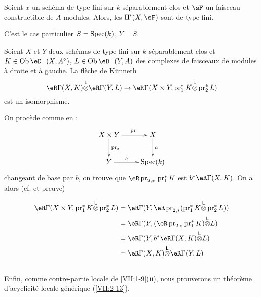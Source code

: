 \begin{corollary_}\label{VII:1-10}
Soient $x$ un schéma de type fini sur $k$ séparablement clos et $\sF$ un 
faisceau constructible de $A$-modules. Alors, les $\h^i(X,\sF)$ sont de type 
fini. 
\end{corollary_}

C'est le cas particulier $S=\operatorname{Spec}(k)$, $Y=S$. 

\begin{corollary_}\label{VII:1-11}
Soient $X$ et $Y$ deux schémas de type fini sur $k$ séparablement clos et 
$K\in \ob\eD^-(X,A^\circ)$, $L\in \ob\eD^-(Y,A)$ des complexes de faisceaux de 
modules à droite et à gauche. La flèche de K\"unneth 
\[
  \eR \Gamma(X,K) \lotimes \eR \Gamma(Y,L) \to \eR\Gamma(X\times Y,\operatorname{pr}_1^\ast K \lotimes \operatorname{pr}_2^\ast L) 
\]
est un isomorphisme. 
\end{corollary_}

On procède comme en \cite[XVII 5.4.3]{sga4}: 
\[\xymatrix{
  X\times Y \ar[r]^-{\text{pr}_1} \ar[d]^-{\text{pr}_2} 
    & X \ar[d]^-a \\
  Y \ar[r]^-b 
    & \spec(k) 
}\]
changeant de base par $b$, on trouve que 
$\eR\operatorname{pr}_{2,\ast}{} \operatorname{pr}_1^\ast K$ est 
$b^\ast \eR\Gamma(X,K)$. On a alors (cf. \cite[XVII 5.2.11]{sga4} et preuve) 

\begin{align*}
  \eR\Gamma(X\times Y,\operatorname{pr}_1^\ast K\lotimes \operatorname{pr}_2^\ast L) 
    &= \eR\Gamma(Y,\eR \operatorname{pr}_{2,\ast}(\operatorname{pr}_1^\ast K\lotimes \operatorname{pr}_2^\ast L)) \\
    &= \eR\Gamma(Y,(\eR\operatorname{pr}_{2,\ast}\operatorname{pr}_1^\ast K)\lotimes L) \\
    &= \eR\Gamma(Y,b^\ast \eR\Gamma(X,K)\lotimes L) \\
    &= \eR\Gamma(X,K)\lotimes \eR\Gamma(Y,L) 
\end{align*}





\subsection{}\label{VII:1-12}

Enfin, comme contre-partie locale de \ref{VII:1-9}(ii), nous prouverons un 
théorème d'acyclicité locale générique (\ref{VII:2-13}). 










